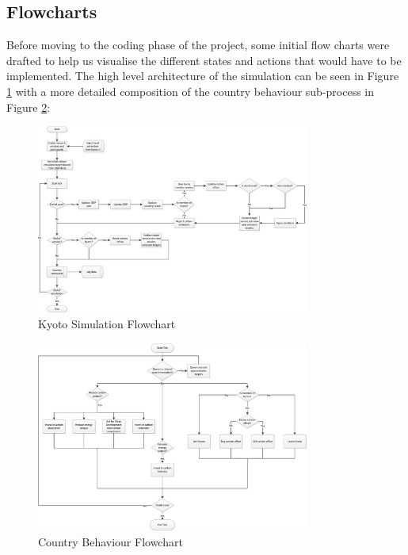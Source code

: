 \subsection{Flowcharts}
Before moving to the coding phase of the project, some initial flow charts were drafted to help us visualise the different states and actions that would have to be implemented. The high level architecture of the simulation can be seen in Figure \ref{fig:kyoto_simulation_flowchart} with a more detailed composition of the country behaviour sub-process in Figure \ref{fig:country_behaviour_flowchart}:

\begin{figure}[h!]
	\centering
	\includegraphics[width=0.8\textwidth]{img/kyoto_simulation_flowchart.png}
	\caption{Kyoto Simulation Flowchart}
	\label{fig:kyoto_simulation_flowchart}
\end{figure}

\begin{figure}[h!]
	\centering
	\includegraphics[width=0.8\textwidth]{img/country_behaviour_flowchart.png}
	\caption{Country Behaviour Flowchart}
	\label{fig:country_behaviour_flowchart}
\end{figure}
